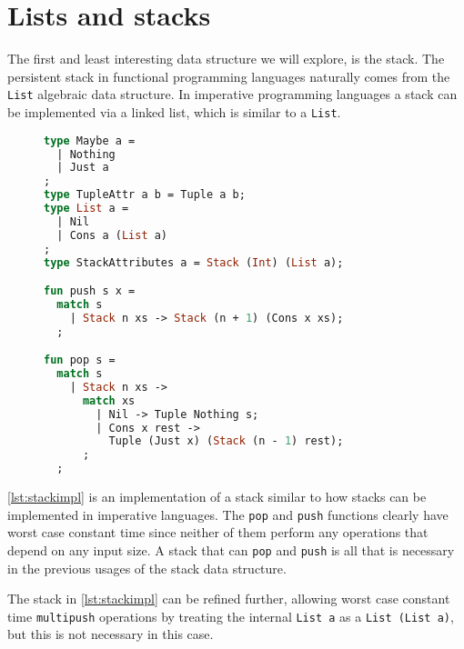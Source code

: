 \section{Lists and stacks}
The first and least interesting data structure we will explore, is the stack.
The persistent stack in functional programming languages naturally comes from the \texttt{List} algebraic data structure.
In imperative programming languages a stack can be implemented via a linked list, which is similar to a \texttt{List}.
\begin{figure}
\begin{lstlisting}[language=ML,caption={Stack implementation},label={lst:stackimpl},mathescape=true]
type Maybe a =
  | Nothing
  | Just a
;
type TupleAttr a b = Tuple a b;
type List a =
  | Nil
  | Cons a (List a)
;
type StackAttributes a = Stack (Int) (List a);

fun push s x = 
  match s
    | Stack n xs -> Stack (n + 1) (Cons x xs);
  ;

fun pop s =
  match s
    | Stack n xs ->
      match xs
        | Nil -> Tuple Nothing s;
        | Cons x rest -> 
          Tuple (Just x) (Stack (n - 1) rest);
      ;
  ;
\end{lstlisting}
\end{figure}
\autoref{lst:stackimpl} is an implementation of a stack similar to how stacks can be implemented in imperative languages.
The \texttt{pop} and \texttt{push} functions clearly have worst case constant time since neither of them perform any operations that depend on any input size.
A stack that can \texttt{pop} and \texttt{push} is all that is necessary in the previous usages of the stack data structure.
\begin{remark}
  The stack in \autoref{lst:stackimpl} can be refined further, allowing worst case constant time \texttt{multipush} operations by treating the internal \texttt{List a} as a \texttt{List (List a)}, but this is not necessary in this case.
\end{remark}

